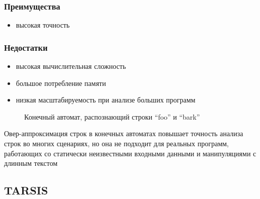 \subsubsection*{Преимущества}
\begin{itemize}
    \item высокая точность
\end{itemize}

\subsubsection*{Недостатки}
\begin{itemize}
    \item высокая вычислительная сложность
    \item большое потребление памяти
    \item низкая масштабируемость при анализе больших программ
\end{itemize}

\begin{figure}[h]
    \centering
    \caption{Конечный автомат, распознающий строки ``foo'' и ``bark''}
\label{fig:automaton}
\end{figure}

Овер-аппроксимация строк в конечных автоматах повышает точность анализа строк во многих сценариях, но она не подходит для реальных программ, работающих со статически неизвестными входными данными и манипуляциями с длинным текстом




\newpage
\subsection{TARSIS}

